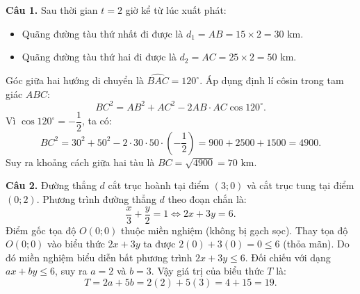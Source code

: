 \documentclass[12pt,a4paper]{article}
\begin{document}
\textbf{Câu 1.} Sau thời gian $t = 2$ giờ kể từ lúc xuất phát:
\begin{itemize}[leftmargin=0.5cm, itemsep=1pt, topsep=1pt]
    \item Quãng đường tàu thứ nhất đi được là $d_1 = AB = 15 \times 2 = 30\text{ km}$.
    \item Quãng đường tàu thứ hai đi được là $d_2 = AC = 25 \times 2 = 50\text{ km}$.
\end{itemize}
Góc giữa hai hướng di chuyển là $\widehat{BAC} = 120^\circ$. Áp dụng định lí côsin trong tam giác $ABC$:
\[
BC^2 = AB^2 + AC^2 - 2 AB \cdot AC \cos 120^\circ.
\]
Vì $\cos 120^\circ = -\dfrac{1}{2}$, ta có:
\[
BC^2 = 30^2 + 50^2 - 2 \cdot 30 \cdot 50 \cdot \left(-\dfrac{1}{2}\right) = 900 + 2500 + 1500 = 4900.
\]
Suy ra khoảng cách giữa hai tàu là $BC = \sqrt{4900} = 70\text{ km}$.

\textbf{Câu 2.} Đường thẳng $d$ cắt trục hoành tại điểm $(3; 0)$ và cắt trục tung tại điểm $(0; 2)$.
Phương trình đường thẳng $d$ theo đoạn chắn là:
\[
\dfrac{x}{3} + \dfrac{y}{2} = 1 \iff 2x + 3y = 6.
\]
Điểm gốc tọa độ $O(0; 0)$ thuộc miền nghiệm (không bị gạch sọc). Thay tọa độ $O(0; 0)$ vào biểu thức $2x + 3y$ ta được $2(0) + 3(0) = 0 \le 6$ (thỏa mãn).
Do đó miền nghiệm biểu diễn bất phương trình $2x + 3y \le 6$.
Đối chiếu với dạng $ax + by \le 6$, suy ra $a = 2$ và $b = 3$.
Vậy giá trị của biểu thức $T$ là:
\[
T = 2a + 5b = 2(2) + 5(3) = 4 + 15 = 19.
\]
\end{document}
